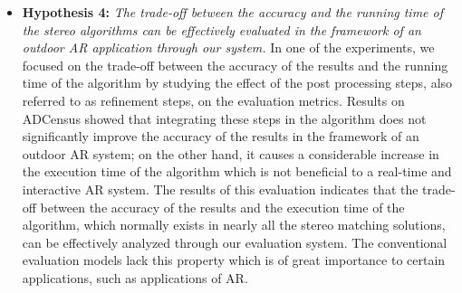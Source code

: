 \begin{itemize}
\item \textbf{Hypothesis 4:} \emph{The trade-off between the accuracy and the running time of the stereo algorithms can be effectively evaluated 
in the framework of an outdoor AR application through our system.} 
In one of the experiments, we focused on the trade-off between the accuracy of the results and the running time of the algorithm by studying the effect
of the post processing steps, also referred to as refinement steps, on the evaluation metrics. Results on ADCensus showed that integrating these steps in the algorithm
does not significantly improve the accuracy of the results in the framework of an outdoor AR system; on the other hand, it causes a considerable increase in the execution
time of the algorithm which is not beneficial to a real-time and interactive AR system. The results of this evaluation indicates that the trade-off between the accuracy 
of the results and the execution time of the algorithm, which normally exists in nearly all the stereo matching solutions, can be effectively analyzed 
through our evaluation system. The conventional evaluation models lack this property which is of great importance to certain applications, such as applications of AR.

\end{itemize}

